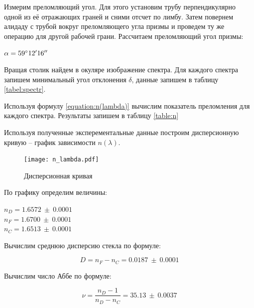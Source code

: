 	Измерим преломляющий угол. Для этого установим трубу перпендикулярно одной из её отражающих граней и сними отсчет по лимбу. Затем повернем алидаду с трубой вокруг преломляющего угла призмы и проведем ту же операцию для другой рабочей грани.
	Рассчитаем преломляющий угол призмы:
	
	\begin{center}
		$\alpha = 59 \degree 12'16''$
	\end{center}

	Вращая столик найдем в окуляре изображение спектра. Для каждого спектра запишем минимальный угол отклонения $\delta$, данные запишем в таблицу \ref{tabel:spectr}.
	
	
	
	Используя формулу \eqref{equation:n(lambda)} вычислим показатель преломления для каждого спектра. Результаты запишем в таблицу \ref{table:n}
	
	
	
	Используя полученные эксперементальные данные построим дисперсионную кривую -- график зависимости $n(\lambda)$.
	
	\begin{figure}
		\centering
		\texttt{[image: n\_lambda.pdf]}
		\caption{Дисперсионная кривая}
		\label{figure:n_lambda}
	\end{figure}

	По графику определим величины:
	
	\begin{center}
		$n_D = 1.6572 ~ \pm ~ 0.0001$ \\
		$n_F = 1.6700 ~ \pm ~ 0.0001$ \\
		$n_C = 1.6513 ~ \pm ~ 0.0001$ \\
	\end{center}

	Вычислим среднюю дисперсию стекла по формуле:
	
	\begin{equation}
		D = n_F - n_C = 0.0187 ~ \pm ~ 0.0001
	\end{equation}
	
	Вычислим число Аббе по формуле:
	
	\begin{equation}
		\nu = \frac{n_D - 1}{n_D - n_C} = 35.13 ~ \pm ~ 0.0037
	\end{equation}
	

